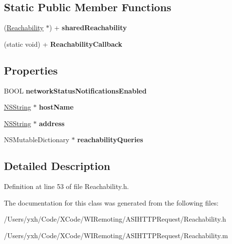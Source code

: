 \subsection*{Static Public Member Functions}
\begin{DoxyCompactItemize}
\item 
\hypertarget{interface_reachability_a56cb0023c24d53da6ced5b00471f698a}{
(\hyperlink{interface_reachability}{Reachability} $\ast$) + {\bfseries sharedReachability}}
\label{interface_reachability_a56cb0023c24d53da6ced5b00471f698a}

\item 
\hypertarget{interface_reachability_a9a6bb79747d4bdcfce495d572e8db6d2}{
(static void) + {\bfseries ReachabilityCallback}}
\label{interface_reachability_a9a6bb79747d4bdcfce495d572e8db6d2}

\end{DoxyCompactItemize}
\subsection*{Properties}
\begin{DoxyCompactItemize}
\item 
\hypertarget{interface_reachability_aa19e38ce7ae2d30733e3507f170a7c65}{
BOOL {\bfseries networkStatusNotificationsEnabled}}
\label{interface_reachability_aa19e38ce7ae2d30733e3507f170a7c65}

\item 
\hypertarget{interface_reachability_ab5e6cb602747f5c6cf592494c1e4c580}{
\hyperlink{class_n_s_string}{NSString} $\ast$ {\bfseries hostName}}
\label{interface_reachability_ab5e6cb602747f5c6cf592494c1e4c580}

\item 
\hypertarget{interface_reachability_a8528e6b8d9ad30ffa5e7c9d8f9b36f89}{
\hyperlink{class_n_s_string}{NSString} $\ast$ {\bfseries address}}
\label{interface_reachability_a8528e6b8d9ad30ffa5e7c9d8f9b36f89}

\item 
\hypertarget{interface_reachability_ab2b0107aa10ba953e9fb1b274e135305}{
NSMutableDictionary $\ast$ {\bfseries reachabilityQueries}}
\label{interface_reachability_ab2b0107aa10ba953e9fb1b274e135305}

\end{DoxyCompactItemize}


\subsection{Detailed Description}


Definition at line 53 of file Reachability.h.

The documentation for this class was generated from the following files:\begin{DoxyCompactItemize}
\item 
/Users/yxh/Code/XCode/WIRemoting/ASIHTTPRequest/Reachability.h\item 
/Users/yxh/Code/XCode/WIRemoting/ASIHTTPRequest/Reachability.m\end{DoxyCompactItemize}
